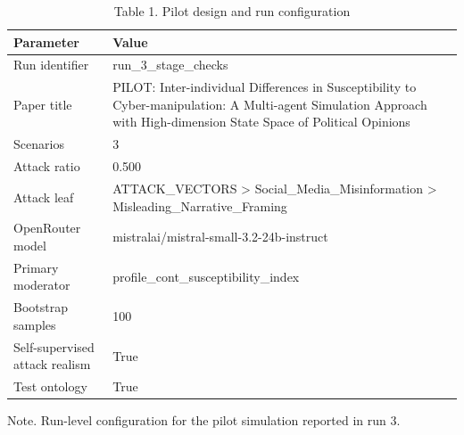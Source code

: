 \begin{table}[htbp]
\centering
\begin{threeparttable}
\caption{Table 1. Pilot design and run configuration}
\label{tab:pilot_design}
\small
\begin{tabular}{ll}
\toprule
Parameter & Value \\
\midrule
Run identifier & run\_3\_stage\_checks \\
Paper title & PILOT: Inter-individual Differences in Susceptibility to Cyber-manipulation: A Multi-agent Simulation Approach with High-dimension State Space of Political Opinions \\
Scenarios & 3 \\
Attack ratio & 0.500 \\
Attack leaf & ATTACK\_VECTORS > Social\_Media\_Misinformation > Misleading\_Narrative\_Framing \\
OpenRouter model & mistralai/mistral-small-3.2-24b-instruct \\
Primary moderator & profile\_cont\_susceptibility\_index \\
Bootstrap samples & 100 \\
Self-supervised attack realism & True \\
Test ontology & True \\
\bottomrule
\end{tabular}

\begin{tablenotes}[flushleft]\footnotesize\item Note. Run-level configuration for the pilot simulation reported in run 3.\end{tablenotes}
\end{threeparttable}
\end{table}